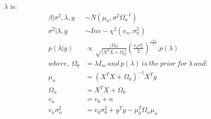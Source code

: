 \documentclass[
]{article}
\begin{document}
\(\lambda\) is: \[
\begin{aligned}
\beta|\sigma^2, \lambda,y &\sim N(\mu_n,\sigma^2\Omega_n^{-1})\\
\sigma^2|\lambda,y &\sim Inv-\chi^2(v_n,\sigma^2_n)\\
p(\lambda|y) &\propto \sqrt\frac{|\Omega_0|}{|X^TX+\Omega_0|}(\frac{v_n\sigma_n^2}{2})^{\frac{-v_n}{2}}.p(\lambda)\\
where,\ \Omega_0&=\lambda I_m \ and\ p(\lambda) \ is\  the\  prior\  for\  \lambda \ and:\\
\mu_n&= (X^TX+\Omega_0)^{-1} X^Ty\\
\Omega_n&=X^TX+\Omega_0\\
v_n&=v_0+n\\
v_n\sigma_n^2&=v_0\sigma_0^2+y^Ty-\mu_0^T\Omega_n\mu_n
\end{aligned}
\]
\end{document}
